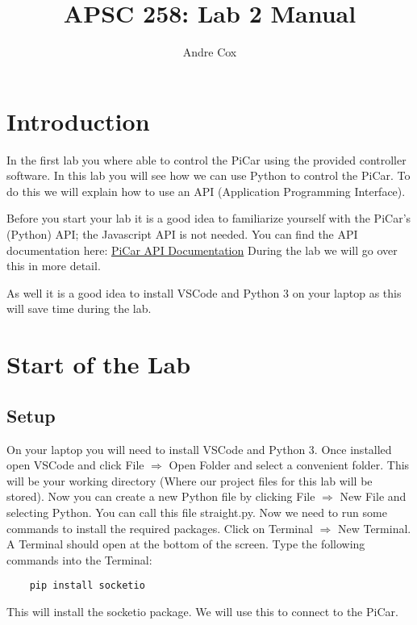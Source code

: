 \documentclass[11pt]{report}
\title{APSC 258: Lab 2 Manual}
\author{Andre Cox}
\begin{document}
    \maketitle
    \tableofcontents


    \chapter{Introduction}
    In the first lab you where able to control the PiCar using the provided controller software. In this lab you will see how we can use Python to control the PiCar. To do this we will explain how to use an API (Application Programming Interface).


    Before you start your lab it is a good idea to familiarize yourself with the PiCar's (Python) API; the Javascript API is not needed. You can find the API documentation here: \href{https://github.com/PiCarV/Car-Software/wiki/Pi-Car-V-API-Documentation}{PiCar API Documentation} During the lab we will go over this in more detail.

    As well it is a good idea to install VSCode and Python 3 on your laptop as this will save time during the lab.

    \chapter{Start of the Lab}
    \section{Setup}
    On your laptop you will need to install VSCode and Python 3. Once installed open VSCode and click File $\Rightarrow$ Open Folder and select a convenient folder. This will be your working directory (Where our project files for this lab will be stored). 
    Now you can create a new Python file by clicking File $\Rightarrow$ New File and selecting Python. You can call this file straight.py. Now we need to run some commands to install the required packages. Click on Terminal $\Rightarrow$ New Terminal. A Terminal should open at the bottom of the screen. Type the following commands into the Terminal: 
    \begin{verbatim}
    pip install socketio 
    \end{verbatim}
    This will install the socketio package. We will use this to connect to the PiCar.
\end{document}
